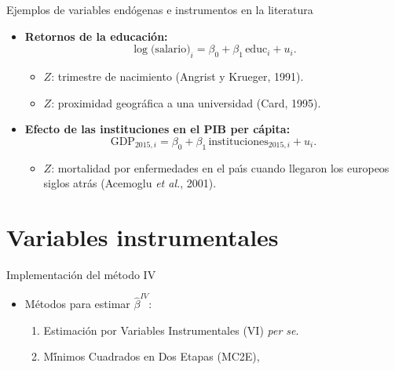 \documentclass[10pt]{beamer}
\begin{document}
\begin{frame}{Ejemplos de variables end\'ogenas e instrumentos en la literatura}
    \begin{itemize}
        \item \textbf{Retornos de la educaci\'on:}
        $$
        \log \bigl(\text{salario}\bigr)_{i}=\beta_{0}+\beta_{1} \,\text{educ}_{i}+u_{i}.
        $$
        \begin{itemize}
            \item $Z$: trimestre de nacimiento (Angrist y Krueger, 1991).
            \item $Z$: proximidad geogr\'afica a una universidad (Card, 1995).
        \end{itemize}

        \item \textbf{Efecto de las instituciones en el PIB per c\'apita:}
        $$
        \text{GDP}_{2015,i}=\beta_{0}+\beta_{1}\, \text{instituciones}_{2015,i}+u_{i}.
        $$
        \begin{itemize}
            \item $Z$: mortalidad por enfermedades en el pa\'\i s cuando llegaron los europeos siglos atr\'as (Acemoglu \emph{et al.}, 2001).
        \end{itemize}
    \end{itemize}
\end{frame}

\section{Variables instrumentales}

\begin{frame}{Implementaci\'on del m\'etodo IV}
    \begin{itemize}
        \item M\'etodos para estimar $\hat{\beta}^{IV}$:
        \begin{enumerate}
            \item Estimaci\'on por Variables Instrumentales (VI) \textit{per se}.
            \item M\'\'inimos Cuadrados en Dos Etapas (MC2E), 
        \end{enumerate}
    \end{itemize}
\end{frame}
\end{document}
